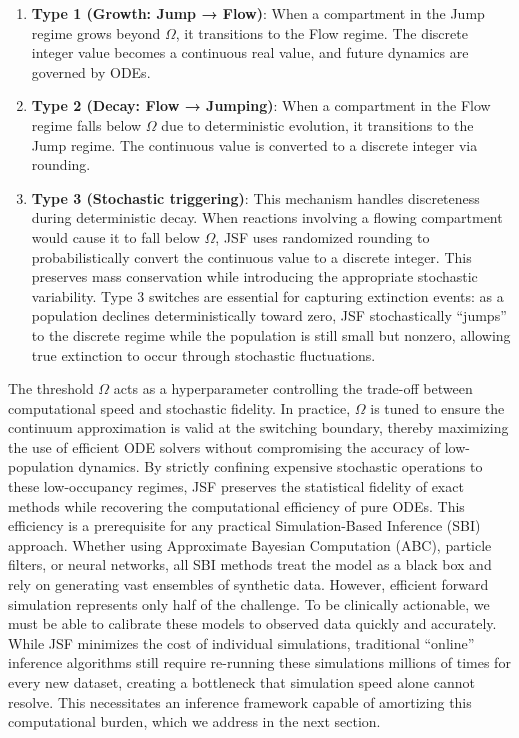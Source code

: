 \documentclass{article}
\begin{document}
\begin{enumerate} 
\item \textbf{Type 1 (Growth: Jump → Flow)}: When a compartment in the Jump regime grows beyond $\Omega$, it transitions to the Flow regime. The discrete integer value becomes a continuous real value, and future dynamics are governed by ODEs.

\item \textbf{Type 2 (Decay: Flow → Jumping)}: When a compartment in the Flow regime falls below $\Omega$ due to deterministic evolution, it transitions to the Jump regime. The continuous value is converted to a discrete integer via rounding.

\item \textbf{Type 3 (Stochastic triggering)}: This mechanism handles discreteness during deterministic decay. When reactions involving a flowing compartment would cause it to fall below $\Omega$, JSF uses randomized rounding to probabilistically convert the continuous value to a discrete integer. This preserves mass conservation while introducing the appropriate stochastic variability. Type 3 switches are essential for capturing extinction events: as a population declines deterministically toward zero, JSF stochastically ``jumps'' to the discrete regime while the population is still small but nonzero, allowing true extinction to occur through stochastic fluctuations. 
\end{enumerate}
















The threshold $\Omega$ acts as a hyperparameter controlling the trade-off between computational speed and stochastic fidelity. In practice, $\Omega$ is tuned to ensure the continuum approximation is valid at the switching boundary, thereby maximizing the use of efficient ODE solvers without compromising the accuracy of low-population dynamics. By strictly confining expensive stochastic operations to these low-occupancy regimes, JSF preserves the statistical fidelity of exact methods while recovering the computational efficiency of pure ODEs. This efficiency is a prerequisite for any practical Simulation-Based Inference (SBI) approach. Whether using Approximate Bayesian Computation (ABC), particle filters, or neural networks, all SBI methods treat the model as a black box and rely on generating vast ensembles of synthetic data. However, efficient forward simulation represents only half of the challenge. To be clinically actionable, we must be able to calibrate these models to observed data quickly and accurately. While JSF minimizes the cost of individual simulations, traditional ``online'' inference algorithms still require re-running these simulations millions of times for every new dataset, creating a bottleneck that simulation speed alone cannot resolve. This necessitates an inference framework capable of amortizing this computational burden, which we address in the next section.
\end{document}
